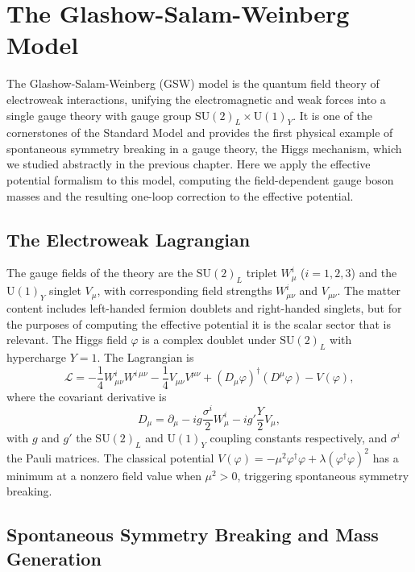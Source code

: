 \chapter{The Glashow-Salam-Weinberg Model}
\label{ch:gsw-model}

The Glashow-Salam-Weinberg (GSW) model is the quantum field theory of
electroweak interactions, unifying the electromagnetic and weak forces
into a single gauge theory with gauge group $\mathrm{SU}(2)_L \times
	\mathrm{U}(1)_Y$. It is one of the cornerstones of the Standard Model
and provides the first physical example of spontaneous symmetry breaking
in a gauge theory, the Higgs mechanism, which we studied abstractly in
the previous chapter. Here we apply the effective potential formalism to
this model, computing the field-dependent gauge boson masses and the
resulting one-loop correction to the effective potential.

\section{The Electroweak Lagrangian}

The gauge fields of the theory are the $\mathrm{SU}(2)_L$ triplet
$W_\mu^i$ ($i=1,2,3$) and the $\mathrm{U}(1)_Y$ singlet $V_\mu$, with
corresponding field strengths $W_{\mu\nu}^i$ and $V_{\mu\nu}$. The
matter content includes left-handed fermion doublets and right-handed
singlets, but for the purposes of computing the effective potential it
is the scalar sector that is relevant. The Higgs field $\varphi$ is a
complex doublet under $\mathrm{SU}(2)_L$ with hypercharge $Y=1$. The
Lagrangian is
\begin{equation}
	\mathcal{L} = -\frac{1}{4}W_{\mu\nu}^i W^{i\,\mu\nu}
	- \frac{1}{4}V_{\mu\nu}V^{\mu\nu}
	+ (D_\mu\varphi)^\dagger(D^\mu\varphi)
	- V(\varphi),
\end{equation}
where the covariant derivative is
\begin{equation}
	D_\mu = \partial_\mu - ig\frac{\sigma^i}{2}W_\mu^i
	- ig'\frac{Y}{2}V_\mu,
\end{equation}
with $g$ and $g'$ the $\mathrm{SU}(2)_L$ and $\mathrm{U}(1)_Y$ coupling
constants respectively, and $\sigma^i$ the Pauli matrices. The classical
potential $V(\varphi) = -\mu^2\varphi^\dagger\varphi +
	\lambda(\varphi^\dagger\varphi)^2$ has a minimum at a nonzero field
value when $\mu^2 > 0$, triggering spontaneous symmetry breaking.

\section{Spontaneous Symmetry Breaking and Mass Generation}

